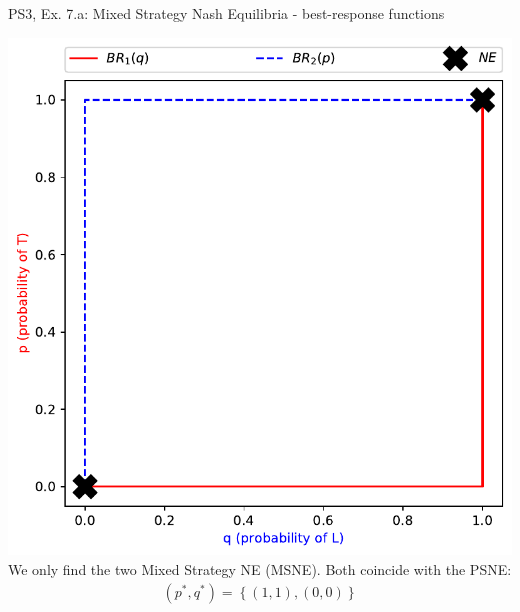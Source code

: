 \begin{frame}{PS3, Ex. 7.a: Mixed Strategy Nash Equilibria - best-response functions}
\begin{multicols}{2}
    \includegraphics[width=\columnwidth]{figures/5a2}
    We only find the two Mixed Strategy NE (MSNE). Both coincide with the PSNE:
    \begin{align*}
      (p^{*},q^{*})=\left\{(1,1),(0,0)\right\}
    \end{align*}
  \vfill\null
  \end{multicols}
\end{frame}
